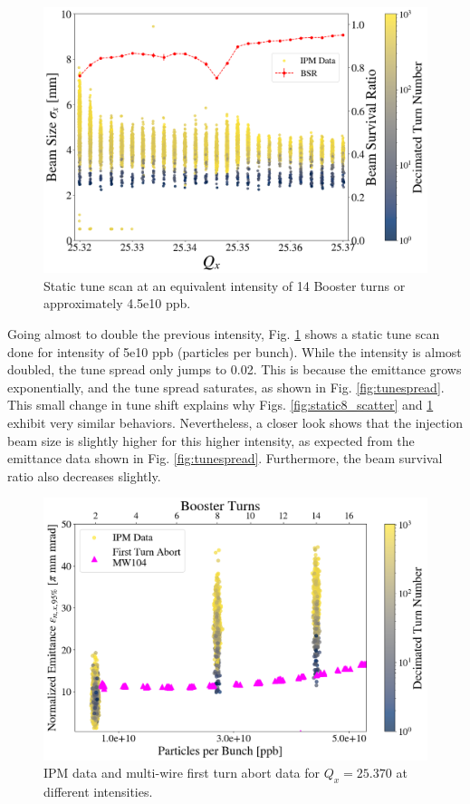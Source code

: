 \begin{figure}[H]
    \centering
    \includegraphics[width=\columnwidth]{chapter6/static14turns_dampersOFF.png}
    \caption{Static tune scan at an equivalent intensity of 14 Booster turns or approximately 4.5e10 ppb.}
    \label{fig:static14_scatter}
\end{figure}

Going almost to double the previous intensity, Fig. \ref{fig:static14_scatter} shows a static tune scan done for intensity of 5e10 ppb (particles per bunch). While the intensity is almost doubled, the tune spread only jumps to 0.02. This is because the emittance grows exponentially, and the tune spread saturates, as shown in Fig. \ref{fig:tunespread}. This small change in tune shift explains why Figs. \ref{fig:static8_scatter} and \ref{fig:static14_scatter} exhibit very similar behaviors. Nevertheless, a closer look shows that the injection beam size is slightly higher for this higher intensity, as expected from the emittance data shown in Fig. \ref{fig:tunespread}. Furthermore, the beam survival ratio also decreases slightly. 

\begin{figure}[H]
    \centering
    \includegraphics[width=\columnwidth]{chapter6/25370_scatter.png}
    \caption{IPM data and multi-wire first turn abort data for $Q_x=25.370$ at different intensities.}
    \label{fig:25370_scatter}
\end{figure}

